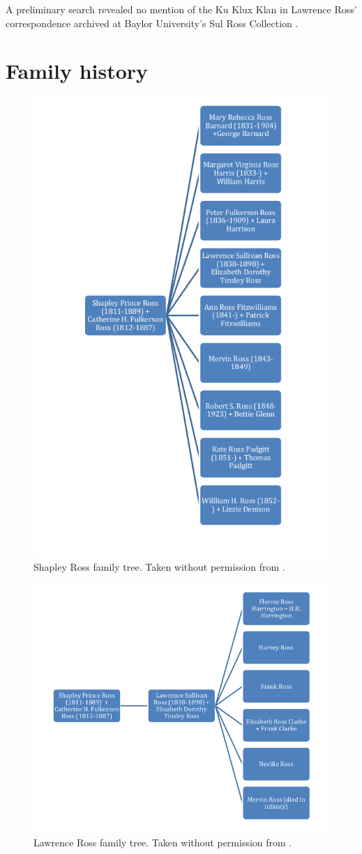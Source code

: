 \documentclass[12pt]{article}
\begin{document}
A preliminary search revealed no mention of the Ku Klux Klan in Lawrence Ross' correspondence archived at Baylor University's Sul Ross Collection \cite{vaughan:email}.

\newpage
\section{Family history}

\begin{figure}[h]
\centering
\includegraphics[width=0.6\linewidth]{figures/shapley_ross_family_tree}
\caption{Shapley Ross family tree. Taken without permission from \cite{rosspapersummary}.}
\end{figure}

\begin{figure}[h]
\centering
\includegraphics[width=0.7\linewidth]{figures/lawrence_ross_family_tree}
\caption{Lawrence Ross family tree. Taken without permission from \cite{rosspapersummary}.}
\end{figure}
\end{document}
